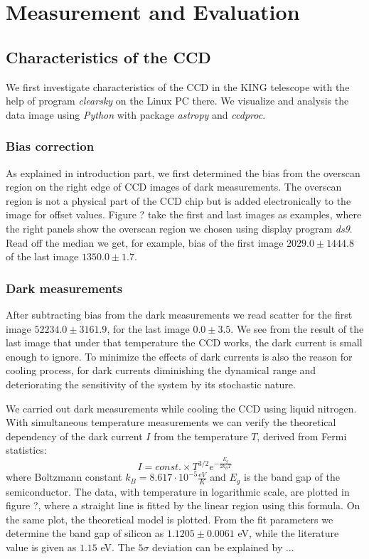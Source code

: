 \section{Measurement and Evaluation}
\subsection{Characteristics of the CCD}
We first investigate characteristics of the CCD in the KING telescope with the help of program \textit{clearsky} on the Linux PC there. We visualize and analysis the data image using \textit{Python} with package \textit{astropy} and \textit{ccdproc}.
\subsubsection{Bias correction}
As explained in introduction part, we first determined the bias from the overscan region on the right edge of CCD images of dark measurements. The overscan region is not a physical part of the CCD chip but is added electronically to the image for offset values. Figure ? take the first and last images as examples, where the right panels show the overscan region we chosen using display program \textit{ds9}. Read off the median we get, for example, bias of the first image $2029.0 \pm 1444.8$  of the last image $1350.0 \pm 1.7$. 

\subsubsection{Dark measurements}
After subtracting bias from the dark measurements we read scatter for the first image $52234.0\pm 3161.9$, for the last image $0.0 \pm 3.5$. We see from the result of the last image that under that temperature the CCD works, the dark current is small enough to ignore. To minimize the effects of dark currents is also the reason for cooling process, for dark currents diminishing the dynamical range and deteriorating the sensitivity of the system by its stochastic nature. 

We carried out dark measurements while cooling the CCD using liquid nitrogen. With simultaneous temperature measurements we can verify the theoretical dependency of the dark current $I$ from the temperature $T$, derived from Fermi statistics: 
\begin{equation}
\label{Eg}
	I = const.\times T^{3/2} e^{-\frac{E_g}{2k_BT}}
\end{equation}
where Boltzmann constant $k_B = 8.617 \cdot 10^{-5} \frac{eV}{K}$ and $E_g$ is the band gap of the semiconductor. The data, with temperature in logarithmic scale, are plotted in figure ?, where a straight line is fitted by the linear region using this formula. On the same plot, the theoretical model is plotted. From the fit parameters we determine the band gap of silicon as $1.1205 \pm 0.0061$ eV, while the literature value is given as $1.15$ eV. The $5\sigma$ deviation can be explained by ...


